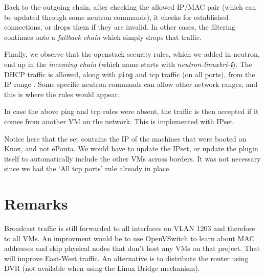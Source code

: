 Back to the outgoing chain, after checking the allowed IP/MAC pair
(which can be updated through some neutron commands), it checks for
established connections, or drops them if they are invalid. In other
cases, the filtering continues onto a \emph{fallback chain} which
simply drops that traffic.


Finally, we observe that the openstack security rules, which we added
in neutron, end up in the \emph{incoming chain} (which name starts
with \emph{neutron-linuxbri-\textbf{i}}). The DHCP traffic is allowed,
along with \texttt{ping} and tcp traffic (on all ports), from the IP
range . Some specific neutron commands can allow
other network ranges, and this is where the rules would appear.


In case the above ping and tcp rules were absent, the traffic is then
accepted if it comes from another VM on the network. This is
implemented with IPset.


Notice here that the set contains the IP of the machines that were
booted on Knox, and not ePouta. We would have to update the IPset, or
update the plugin itself to automatically include the other VMs across
borders. It was not necessary since we had the `All tcp ports' rule
already in place.

\section{Remarks}\label{remarks}

Broadcast traffic is still forwarded to all interfaces on VLAN 1203
and therefore to all VMs. An improvment would be to use OpenVSwitch to
learn about MAC addresses and skip physical nodes that don't host any
VMs on that project. That will improve East-West traffic. An
alternative is to distribute the router using DVR (not available when
using the Linux Bridge mechanism).
